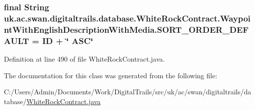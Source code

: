 \hypertarget{classuk_1_1ac_1_1swan_1_1digitaltrails_1_1database_1_1_white_rock_contract_1_1_waypoint_with_english_description_with_media_af53e4a3e11149e792e4e3810be38e574}{
\subsubsection[{S\+O\+R\+T\+\_\+\+O\+R\+D\+E\+R\+\_\+\+D\+E\+F\+A\+U\+L\+T}]{\setlength{\rightskip}{0pt plus 5cm}final String uk.\+ac.\+swan.\+digitaltrails.\+database.\+White\+Rock\+Contract.\+Waypoint\+With\+English\+Description\+With\+Media.\+S\+O\+R\+T\+\_\+\+O\+R\+D\+E\+R\+\_\+\+D\+E\+F\+A\+U\+L\+T = I\+D + \char`\"{} A\+S\+C\char`\"{}\hspace{0.3cm}{\ttfamily [static]}}}\label{classuk_1_1ac_1_1swan_1_1digitaltrails_1_1database_1_1_white_rock_contract_1_1_waypoint_with_english_description_with_media_af53e4a3e11149e792e4e3810be38e574}


Definition at line 490 of file White\+Rock\+Contract.\+java.



The documentation for this class was generated from the following file\+:\begin{DoxyCompactItemize}
\item 
C\+:/\+Users/\+Admin/\+Documents/\+Work/\+Digital\+Trails/src/uk/ac/swan/digitaltrails/database/\hyperlink{_white_rock_contract_8java}{White\+Rock\+Contract.\+java}\end{DoxyCompactItemize}
